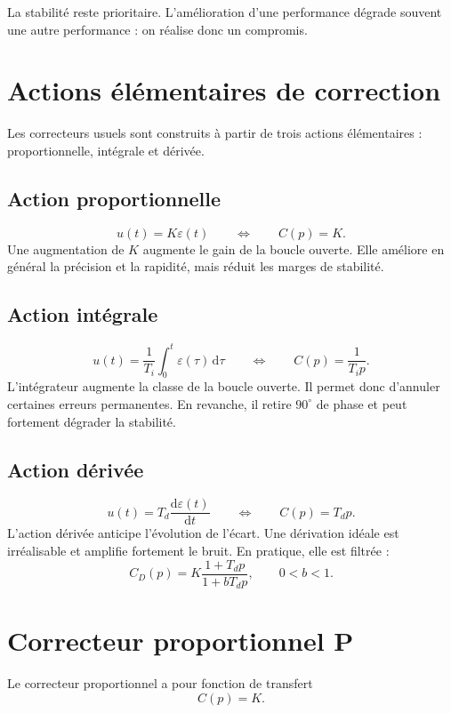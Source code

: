 La stabilité reste prioritaire. L'amélioration d'une performance dégrade souvent
une autre performance : on réalise donc un compromis.

\section{Actions élémentaires de correction}\label{sec:corr-actions}

Les correcteurs usuels sont construits à partir de trois actions élémentaires :
proportionnelle, intégrale et dérivée.

\TLTroisActionsCorrection

\subsection{Action proportionnelle}

\[
u(t)=K\varepsilon(t)
\qquad\Longleftrightarrow\qquad
C(p)=K.
\]
Une augmentation de $K$ augmente le gain de la boucle ouverte. Elle améliore en
général la précision et la rapidité, mais réduit les marges de stabilité.

\subsection{Action intégrale}

\[
u(t)=\frac{1}{T_i}\int_0^t\varepsilon(\tau)\,\mathrm d\tau
\qquad\Longleftrightarrow\qquad
C(p)=\frac{1}{T_i p}.
\]
L'intégrateur augmente la classe de la boucle ouverte. Il permet donc d'annuler
certaines erreurs permanentes. En revanche, il retire $90^\circ$ de phase et peut
fortement dégrader la stabilité.

\subsection{Action dérivée}

\[
u(t)=T_d\frac{\mathrm d\varepsilon(t)}{\mathrm dt}
\qquad\Longleftrightarrow\qquad
C(p)=T_d p.
\]
L'action dérivée anticipe l'évolution de l'écart. Une dérivation idéale est
irréalisable et amplifie fortement le bruit. En pratique, elle est filtrée :
\[
C_D(p)=K\frac{1+T_d p}{1+bT_d p},\qquad 0<b<1.
\]

\section{Correcteur proportionnel P}\label{sec:corr-p}

Le correcteur proportionnel a pour fonction de transfert
\[
\boxed{C(p)=K}.
\]

